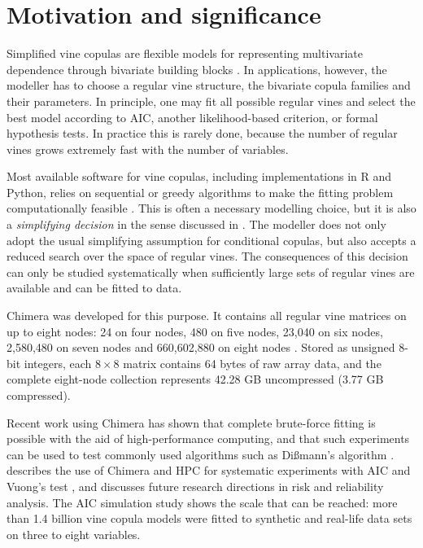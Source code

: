 \documentclass[preprint,12pt, a4paper]{elsarticle}
\begin{document}
\section{Motivation and significance}

Simplified vine copulas are flexible models for representing multivariate dependence through bivariate building blocks \citep{Joe1996, BedfordCooke2001, BedfordCooke2002, Aas2009, Joe2014, Czado2019}. In applications, however, the modeller has to choose a regular vine structure, the bivariate copula families and their parameters. In principle, one may fit all possible regular vines and select the best model according to AIC, another likelihood-based criterion, or formal hypothesis tests. In practice this is rarely done, because the number of regular vines grows extremely fast with the number of variables.

Most available software for vine copulas, including implementations in R and Python, relies on sequential or greedy algorithms to make the fitting problem computationally feasible \citep{Dissmann2013, Schepsmeier2018, Nagler2023}. This is often a necessary modelling choice, but it is also a \textit{simplifying decision} in the sense discussed in \cite{CookeBedford2025}. The modeller does
not only adopt the usual simplifying assumption for conditional copulas, but also accepts a reduced search over the space of regular vines. The consequences of this decision can only be studied systematically when sufficiently large sets of regular vines are available and can be fitted to data.

Chimera was developed for this purpose. It contains all regular vine matrices on up to eight nodes: 24 on four nodes, 480 on five nodes, 23,040 on six nodes, 2,580,480 on seven nodes and 660,602,880 on eight nodes \cite{MoralesNapoles2023Chimera}. Stored as unsigned 8-bit integers, each $8\times8$ matrix contains 64 bytes of raw array data, and the complete eight-node collection represents 42.28 GB uncompressed (3.77 GB compressed). 

Recent work using Chimera has shown that complete brute-force fitting is possible with the aid of high-performance computing, and that such experiments can be used to test commonly used algorithms such as Di{\ss}mann's algorithm \citep{MoralesNapoles2026ESREL, MoralesNapoles2026AIC}. \citep{MoralesNapoles2026ESREL} describes the use of Chimera and HPC for systematic experiments with AIC and Vuong's test \cite{Vuong1989}, and discusses future research directions in risk and reliability analysis. The AIC simulation study shows the scale that can be reached: more than
1.4 billion vine copula models were fitted to synthetic and real-life data sets on three to eight variables. 
\end{document}
